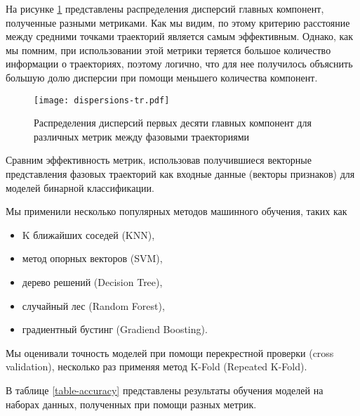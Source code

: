 На рисунке \ref{dispersions-tr} представлены распределения дисперсий главных компонент, полученные разными метриками. Как мы видим, по этому критерию расстояние между средними точками траекторий является самым эффективным. Однако, как мы помним, при использовании этой метрики теряется большое количество информации о траекториях, поэтому логично, что для нее получилось объяснить большую долю дисперсии при помощи меньшего количества компонент.

\begin{figure}[htb]
  \centering
  \texttt{[image: dispersions-tr.pdf]}
  \caption{Распределения дисперсий первых десяти главных компонент для различных метрик между фазовыми траекториями}
  \label{dispersions-tr}
\end{figure}

Сравним эффективность метрик, использовав получившиеся векторные представления фазовых траекторий как входные данные (векторы признаков) для моделей бинарной классификации.

Мы применили несколько популярных методов машинного обучения, таких как
\begin{itemize}
  \item K ближайших соседей (KNN),
  \item метод опорных векторов (SVM),
  \item дерево решений (Decision Tree),
  \item случайный лес (Random Forest),
  \item градиентный бустинг (Gradiend Boosting).
\end{itemize}

Мы оценивали точность моделей при помощи перекрестной проверки (cross validation), несколько раз применяя метод K-Fold (Repeated K-Fold).

В таблице \ref{table-accuracy} представлены результаты обучения моделей на наборах данных, полученных при помощи разных метрик.

\begin{table}[htb]
  \caption{Точность моделей бинарной классификации, обученных на данных, полученных разными метриками}
  \label{table-accuracy}
\end{table}

